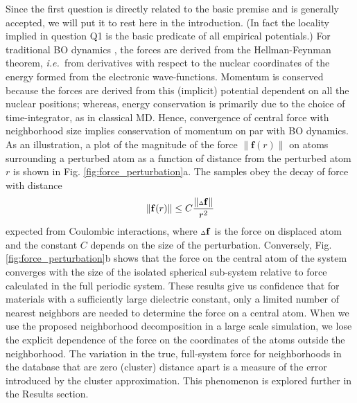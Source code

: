 \documentclass[journal=jctcce,manuscript=article]{achemso}
\newcommand{\fref}[1]{{Fig. \ref{#1}}}
\newcommand{\ie}{{\it i.e.\ }}
\newcommand{\smallDelta}{\mathsmaller{\mathsmaller{\Delta}}}
\newcommand{\fb}{\mathbf{f}}
\begin{document}
Since the first question is directly related to the basic premise and is generally accepted, we will put it to rest here in the introduction.
(In fact the locality implied in question Q1 is the basic predicate of all empirical potentials.)
For traditional BO dynamics \cite{Marx2000,Kuhne2013}, the forces are derived from the Hellman-Feynman theorem, \ie from derivatives with respect to the nuclear coordinates of the energy formed from the electronic wave-functions.
Momentum is conserved because the forces are derived from this (implicit) potential dependent on all the nuclear positions; whereas, energy conservation is primarily due to the choice of time-integrator, as in classical MD.
Hence,
convergence of central force with neighborhood size implies conservation of momentum on par with BO dynamics.
As an illustration, a plot of the magnitude of the force $\| \fb(r) \|$ on atoms surrounding a perturbed atom as a function of distance from the perturbed atom $r$ is shown in \fref{fig:force_perturbation}a.
The samples obey the decay of force with distance
\begin{equation} \label{eq:force_scaling}
\| \fb(r) \| \le C \frac{\| \smallDelta \fb \|}{r^2}
\end{equation}
expected from Coulombic interactions, where $\smallDelta \fb$ is the force on displaced atom and the constant $C$ depends on the size of the perturbation.
Conversely, \fref{fig:force_perturbation}b shows that the force on the central atom of the system converges with the size of the isolated spherical sub-system relative to force calculated in the full periodic system.
These results give us confidence that for materials with a sufficiently large dielectric constant, only a limited number of nearest neighbors are needed to determine the force on a central atom.
When we use the proposed neighborhood decomposition in a large scale simulation, we lose the explicit dependence of the force on the coordinates of the atoms outside the neighborhood. 
The variation in the true, full-system force for neighborhoods in the database that are zero (cluster) distance apart is a measure of the error introduced by the cluster approximation. 
This phenomenon is explored further in the Results section.
\end{document}
